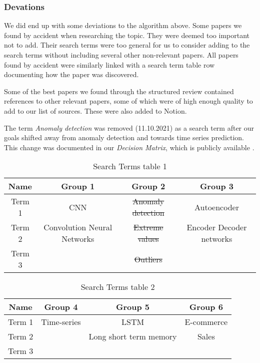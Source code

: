 \subsubsection{Devations}
We did end up with some deviations to the algorithm above.
Some papers we found by accident when researching the topic.
They were deemed too important not to add.
Their search terms were too general for us to consider adding to the search terms without including several other non-relevant papers.
All papers found by accident were similarly linked with a search term table row documenting
how the paper was discovered.

Some of the best papers we found through the structured review contained references to other relevant papers,
some of which were of high enough quality to add to our list of sources.
These were also added to Notion.

The term \textit{Anomaly detection} was removed (11.10.2021) as a search term after our goals shifted away from anomaly detection and towards time series prediction.
This change was documented in our \textit{Decision Matrix}, which is publicly available
\cite{decisionmatrix}.

\begin{table}[h]
  \centering
  \begin{tabular}{|c|c|c|c|}\hline
    Name   & Group 1                     & Group 2                  & Group 3                  \\ \hline
    Term 1 & CNN                         & \sout{Anomaly detection} & Autoencoder              \\ \hline
    Term 2 & Convolution Neural Networks & \sout{Extreme values}    & Encoder Decoder networks \\ \hline
    Term 3 &                             & \sout{Outliers}          &                          \\ \hline
  \end{tabular}
  \caption{Search Terms table 1}
  \label{tab:search-terms-table-1}
\end{table}%

\begin{table}[h]
  \begin{center}
    \begin{tabular}{|c|c|c|c|}\hline
      Name   & Group 4     & Group 5                & Group 6    \\ \hline
      Term 1 & Time-series & LSTM                   & E-commerce \\ \hline
      Term 2 &             & Long short term memory & Sales      \\ \hline
      Term 3 &             &                        &            \\ \hline
    \end{tabular}
    \caption{Search Terms table 2}
    \label{tab:search-terms-table-2}
  \end{center}
\end{table}%

